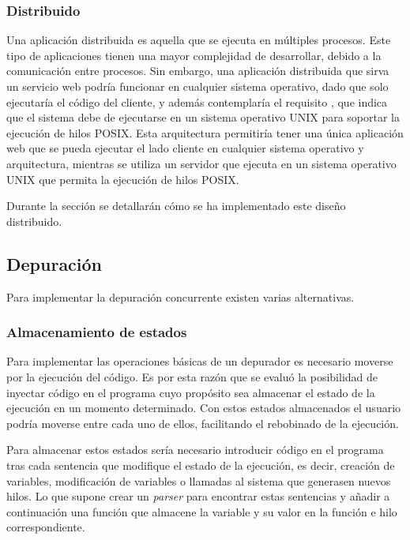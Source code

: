 \subsubsection{Distribuido} \label{subsubsec:distribuido}

Una aplicación distribuida es aquella que se ejecuta en múltiples procesos. Este tipo de aplicaciones tienen una mayor complejidad de desarrollar, debido a la comunicación entre procesos. Sin embargo, una aplicación distribuida que sirva un servicio web podría funcionar en cualquier sistema operativo, dado que solo ejecutaría el código del cliente, y además contemplaría el requisito , que indica que el sistema debe de ejecutarse en un sistema operativo UNIX para soportar la ejecución de hilos POSIX. Esta arquitectura permitiría tener una única aplicación web que se pueda ejecutar el lado cliente en cualquier sistema operativo y arquitectura, mientras se utiliza un servidor que ejecuta en un sistema operativo UNIX que permita la ejecución de hilos POSIX.

Durante la sección  se detallarán cómo se ha implementado este diseño distribuido. 

\subsection{Depuración} \label{subsec:depuracion}

Para implementar la depuración concurrente existen varias alternativas. 

\subsubsection{Almacenamiento de estados} \label{subsec:almacenamiento-estados}

Para implementar las operaciones básicas de un depurador es necesario moverse por la ejecución del código. Es por esta razón que se evaluó la posibilidad de inyectar código en el programa cuyo propósito sea almacenar el estado de la ejecución en un momento determinado. Con estos estados almacenados el usuario podría moverse entre cada uno de ellos, facilitando el rebobinado de la ejecución.

Para almacenar estos estados sería necesario introducir código en el programa tras cada sentencia que modifique el estado de la ejecución, es decir, creación de variables, modificación de variables o llamadas al sistema que generasen nuevos hilos. Lo que supone crear un \textit{\gls{parser}} para encontrar estas sentencias y añadir a continuación una función que almacene la variable y su valor en la función e hilo correspondiente. 

